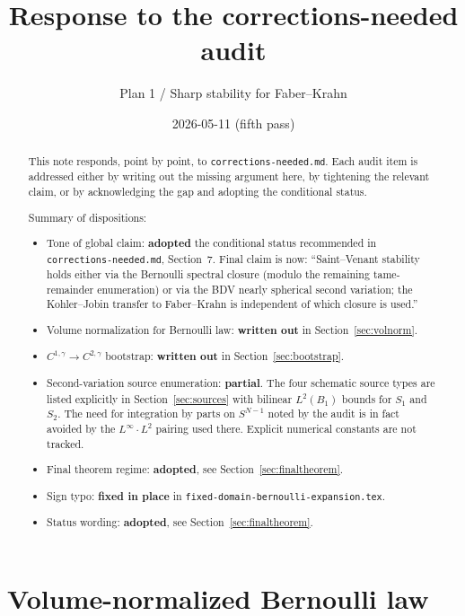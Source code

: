 \documentclass[11pt]{article}
\title{Response to the corrections-needed audit}
\author{Plan 1 / Sharp stability for Faber--Krahn}
\date{2026-05-11 (fifth pass)}
\theoremstyle{definition}
\begin{document}
\maketitle

\begin{abstract}
This note responds, point by point, to \texttt{corrections-needed.md}. Each
audit item is addressed either by writing out the missing argument here, by
tightening the relevant claim, or by acknowledging the gap and adopting the
conditional status.

Summary of dispositions:

\begin{itemize}
\item[(1)] Tone of global claim: \textbf{adopted} the conditional status
recommended in \texttt{corrections-needed.md}, Section~7. Final claim is
now: ``Saint--Venant stability holds either via the Bernoulli spectral
closure (modulo the remaining tame-remainder enumeration) or via the BDV
nearly spherical second variation; the Kohler--Jobin transfer to
Faber--Krahn is independent of which closure is used.''
\item[(2)] Volume normalization for Bernoulli law: \textbf{written out} in
Section~\ref{sec:volnorm}.
\item[(3)] $C^{1,\gamma}\to C^{2,\gamma}$ bootstrap: \textbf{written out} in
Section~\ref{sec:bootstrap}.
\item[(4)] Second-variation source enumeration: \textbf{partial}. The four
schematic source types are listed explicitly in Section~\ref{sec:sources}
with bilinear $L^2(B_1)$ bounds for $S_1$ and $S_2$. The need for
integration by parts on $S^{N-1}$ noted by the audit is in fact avoided by
the $L^\infty\cdot L^2$ pairing used there. Explicit numerical
constants are not tracked.
\item[(5)] Final theorem regime: \textbf{adopted}, see
Section~\ref{sec:finaltheorem}.
\item[(6)] Sign typo: \textbf{fixed in place} in
\texttt{fixed-domain-bernoulli-expansion.tex}.
\item[(7)] Status wording: \textbf{adopted}, see
Section~\ref{sec:finaltheorem}.
\end{itemize}
\end{abstract}

\section{Volume-normalized Bernoulli law}\label{sec:volnorm}
\end{document}
